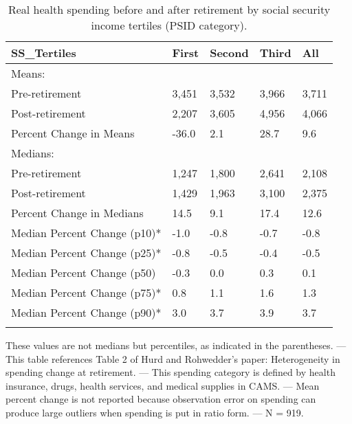 \begin{table}[tbp] \centering
{}

\caption{Real health spending before and after retirement by social security income tertiles (PSID category).}
\begin{tabularx}{\textwidth}{lCCCC}

\toprule
{SS\_Tertiles}&{First}&{Second}&{Third}&{All} \tabularnewline
\midrule\addlinespace[1.5ex]
Means:&&&& \tabularnewline
\midrule Pre-retirement&3,451&3,532&3,966&3,711 \tabularnewline
Post-retirement&2,207&3,605&4,956&4,066 \tabularnewline
Percent Change in Means&-36.0&2.1&28.7&9.6 \tabularnewline
\midrule Medians:&&&& \tabularnewline
\midrule Pre-retirement&1,247&1,800&2,641&2,108 \tabularnewline
Post-retirement&1,429&1,963&3,100&2,375 \tabularnewline
Percent Change in Medians&14.5&9.1&17.4&12.6 \tabularnewline
Median Percent Change (p10)*&-1.0&-0.8&-0.7&-0.8 \tabularnewline
Median Percent Change (p25)*&-0.8&-0.5&-0.4&-0.5 \tabularnewline
Median Percent Change (p50)&-0.3&0.0&0.3&0.1 \tabularnewline
Median Percent Change (p75)*&0.8&1.1&1.6&1.3 \tabularnewline
Median Percent Change (p90)*&3.0&3.7&3.9&3.7 \tabularnewline
\bottomrule \addlinespace[1.5ex]

\end{tabularx}
\begin{flushleft}
\footnotesize *These values are not medians but percentiles, as indicated in the parentheses. \linebreak --- \linebreak This table references Table 2 of Hurd and Rohwedder's paper: Heterogeneity in spending change at retirement. \linebreak --- \linebreak This spending category is defined by health insurance, drugs, health services, and medical supplies in CAMS. \linebreak --- \linebreak Mean percent change is not reported because observation error on spending can produce large outliers when spending is put in ratio form. \linebreak --- \linebreak N = 919.
\end{flushleft}
\end{table}
